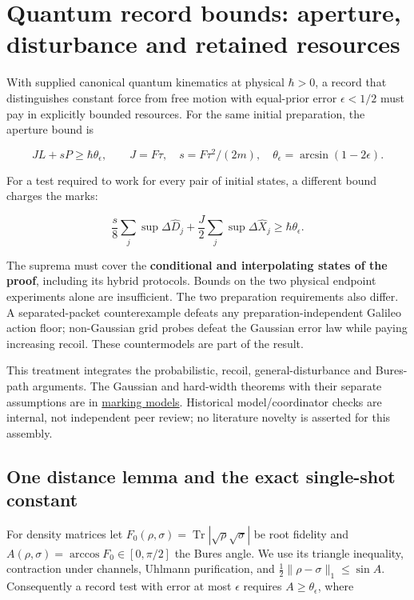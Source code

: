 \documentclass[11pt,a4paper]{article}
\begin{document}
\hypertarget{quantum-record-bounds-aperture-disturbance-and-retained-resources}{%
\section{Quantum record bounds: aperture, disturbance and retained
resources}\label{quantum-record-bounds-aperture-disturbance-and-retained-resources}}

With supplied canonical quantum kinematics at physical \(\hbar>0\), a
record that distinguishes constant force from free motion with
equal-prior error \(\epsilon<1/2\) must pay in explicitly bounded
resources. For the same initial preparation, the aperture bound is

\[JL+sP\ge\hbar\theta_\epsilon,\qquad
J=F\tau,\quad s=F\tau^2/(2m),\quad
\theta_\epsilon=\arcsin(1-2\epsilon).\]

For a test required to work for every pair of initial states, a
different bound charges the marks:

\[\frac s8\sum_j\sup\Delta\hat D_j+
\frac J2\sum_j\sup\Delta\hat X_j\ge\hbar\theta_\epsilon.\]

The suprema must cover the \textbf{conditional and interpolating states
of the proof}, including its hybrid protocols. Bounds on the two
physical endpoint experiments alone are insufficient. The two
preparation requirements also differ. A separated-packet counterexample
defeats any preparation-independent Galileo action floor; non-Gaussian
grid probes defeat the Gaussian error law while paying increasing
recoil. These countermodels are part of the result.

This treatment integrates the probabilistic, recoil, general-disturbance
and Bures-path arguments. The Gaussian and hard-width theorems with
their separate assumptions are in
\href{mark-cost-and-statistical-floor.md}{marking models}. Historical
model/coordinator checks are internal, not independent peer review; no
literature novelty is asserted for this assembly.

\hypertarget{one-distance-lemma-and-the-exact-single-shot-constant}{%
\subsection{One distance lemma and the exact single-shot
constant}\label{one-distance-lemma-and-the-exact-single-shot-constant}}

For density matrices let
\(F_0(\rho,\sigma)=\operatorname{Tr}|\sqrt\rho\sqrt\sigma|\) be root
fidelity and \(A(\rho,\sigma)=\arccos F_0\in[0,\pi/2]\) the Bures angle.
We use its triangle inequality, contraction under channels, Uhlmann
purification, and \(\tfrac12\|\rho-\sigma\|_1\le\sin A\). Consequently a
record test with error at most \(\epsilon\) requires
\(A\ge\theta_\epsilon\), where
\end{document}
